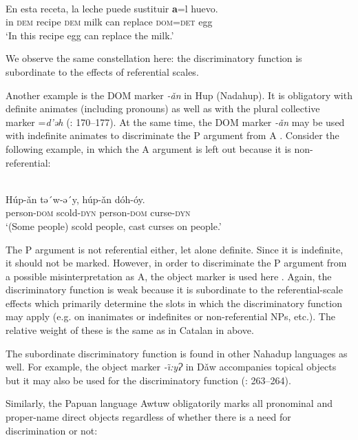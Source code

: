 \documentclass[output=paper]{langsci/langscibook}
\begin{document}
\ea\label{ex:serzant:}
\\
\gll En esta receta, la   leche   puede   sustituir \textbf{a}=l     huevo.\\
     in  \textsc{dem} recipe \textsc{dem}   milk   can   replace \textsc{dom=det}   egg\\
\glt ‘In this recipe egg can replace the milk.’
\z

We observe the same constellation here: the discriminatory function is subordinate to the effects of referential scales. 

Another example is the DOM marker \textit{{}-ǎn} in Hup (Nadahup). It is obligatory with definite animates (including pronouns) as well as with the plural collective marker =\textit{d’ǝh} (\citealt{Epps2008}: 170–177). At the same time, the DOM marker \textit{{}-ǎn} may be used with indefinite animates to discriminate the P argument from A \citep[95]{Epps2009}. Consider the following example, in which the A argument is left out because it is non-referential: 

\ea\label{ex:serzant:}
\\
\gll Húp-ǎn   tǝ´w-ǝ´y,   húp-ǎn    dóh-óy.\\
     person-\textsc{dom}  scold-\textsc{dyn}  person-\textsc{dom}  curse-\textsc{dyn}\\
\glt ‘(Some people) scold people, cast curses on people.’
\z

The P argument is not referential either, let alone definite. Since it is indefinite, it should not be marked. However, in order to discriminate the P argument from a possible misinterpretation as A, the object marker is used here \citep[95]{Epps2009}. Again, the discriminatory function is weak because it is subordinate to the referential-scale effects which primarily determine the slots in which the discriminatory function may apply (e.g. on inanimates or indefinites or non-referential NPs, etc.). The relative weight of these is the same as in Catalan in  above. 

The subordinate discriminatory function is found in other Nahadup languages as well. For example, the object marker \textit{{}-\~\i:yɁ} in Dǎw accompanies topical objects but it may also be used for the discriminatory function (\citealt{MartinsMartins1999}: 263–264). 

Similarly, the Papuan language Awtuw obligatorily marks all pronominal and proper-name direct objects regardless of whether there is a need for discrimination or not:
\end{document}
